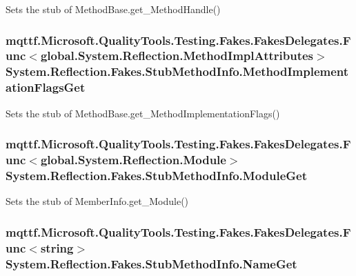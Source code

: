 Sets the stub of Method\-Base.\-get\-\_\-\-Method\-Handle()

\hypertarget{class_system_1_1_reflection_1_1_fakes_1_1_stub_method_info_a2bc806617488ff185545ae89def1ceae}{
\subsubsection[{Method\-Implementation\-Flags\-Get}]{\setlength{\rightskip}{0pt plus 5cm}mqttf.\-Microsoft.\-Quality\-Tools.\-Testing.\-Fakes.\-Fakes\-Delegates.\-Func$<$global.\-System.\-Reflection.\-Method\-Impl\-Attributes$>$ System.\-Reflection.\-Fakes.\-Stub\-Method\-Info.\-Method\-Implementation\-Flags\-Get}}\label{class_system_1_1_reflection_1_1_fakes_1_1_stub_method_info_a2bc806617488ff185545ae89def1ceae}


Sets the stub of Method\-Base.\-get\-\_\-\-Method\-Implementation\-Flags()

\hypertarget{class_system_1_1_reflection_1_1_fakes_1_1_stub_method_info_a620c5971673cda758bb46c427c317c3a}{
\subsubsection[{Module\-Get}]{\setlength{\rightskip}{0pt plus 5cm}mqttf.\-Microsoft.\-Quality\-Tools.\-Testing.\-Fakes.\-Fakes\-Delegates.\-Func$<$global.\-System.\-Reflection.\-Module$>$ System.\-Reflection.\-Fakes.\-Stub\-Method\-Info.\-Module\-Get}}\label{class_system_1_1_reflection_1_1_fakes_1_1_stub_method_info_a620c5971673cda758bb46c427c317c3a}


Sets the stub of Member\-Info.\-get\-\_\-\-Module()

\hypertarget{class_system_1_1_reflection_1_1_fakes_1_1_stub_method_info_abc33565f98fd727217015bf07f0422be}{
\subsubsection[{Name\-Get}]{\setlength{\rightskip}{0pt plus 5cm}mqttf.\-Microsoft.\-Quality\-Tools.\-Testing.\-Fakes.\-Fakes\-Delegates.\-Func$<$string$>$ System.\-Reflection.\-Fakes.\-Stub\-Method\-Info.\-Name\-Get}}\label{class_system_1_1_reflection_1_1_fakes_1_1_stub_method_info_abc33565f98fd727217015bf07f0422be}


